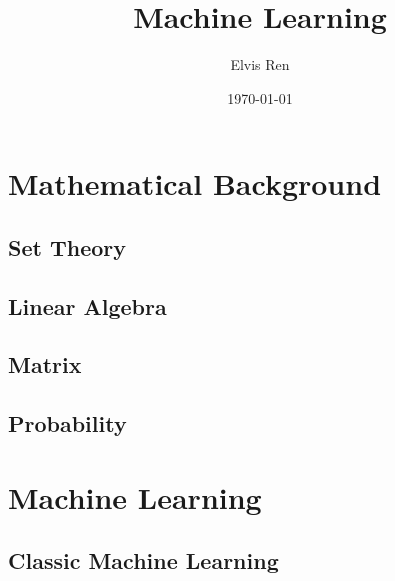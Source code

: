 \documentclass[reqno]{book}
\begin{document}
\title{Machine Learning}
\author{Elvis Ren}
\date{\today}

\maketitle
\tableofcontents


\part{Mathematical Background}

\chapter{Set Theory}





\chapter{Linear Algebra}










\chapter{Matrix}



\chapter{Probability}



\part{Machine Learning}

\chapter{Classic Machine Learning}


\end{document}
